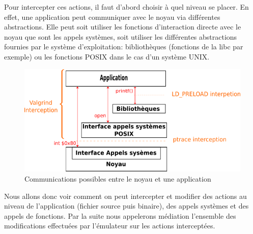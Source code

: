 Pour intercepter ces actions, il faut d'abord choisir à quel niveau se placer.
 En effet, une application peut communiquer avec le noyau via différentes
 abstractions. Elle peut soit utiliser les fonctions d'interaction directe avec
 le noyau que sont les appels systèmes, soit utiliser les différentes
 abstractions fournies par le système d'exploitation: bibliothèques (fonctions
 de la libc par exemple) ou les fonctions POSIX dans le cas d'un système UNIX.

\begin{figure}[H]
 \centering
 \includegraphics[scale=0.75]{Pictures/png/Communication_application_noyau_v3.png}
 \caption{Communications possibles entre le noyau et une application}
 \label{AS_Communication}
\end{figure}

Nous allons donc voir comment on peut intercepter et modifier des actions au
niveau de l'application (fichier source puis binaire), des appels systèmes et
des appels de fonctions. Par la suite nous appelerons médiation l'ensemble des
modifications effectuées par l'émulateur sur les actions interceptées.
